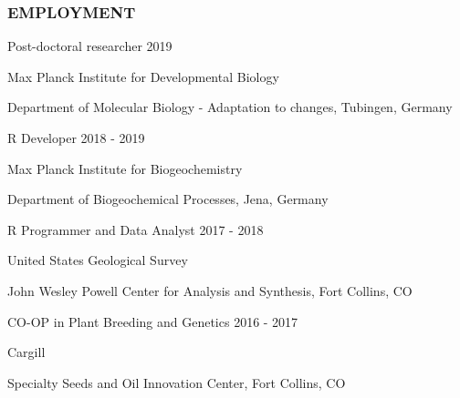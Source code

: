 \documentclass[12pt,english]{article}
\begin{document}

\subsubsection*{EMPLOYMENT}
\vspace{-0.5ex}\par

\hspace{1.0em} Post-doctoral researcher
\hfill
2019
\vspace{-0.5ex}\par
\hspace{2.0em} Max Planck Institute for Developmental Biology
\vspace{-0.5ex}\par
\hspace{2.0em} Department of Molecular Biology - Adaptation to changes, Tubingen, Germany
\hfill
\vspace{0.5em}\par

\hspace{1.0em} R Developer
\hfill
2018 - 2019
\vspace{-0.5ex}\par
\hspace{2.0em} Max Planck Institute for Biogeochemistry
\vspace{-0.5ex}\par
\hspace{2.0em} Department of Biogeochemical Processes, Jena, Germany
\hfill
\vspace{0.5em}\par

\hspace{1.0em} R Programmer and Data Analyst
\hfill
2017 - 2018
\vspace{-0.5ex}\par
\hspace{2.0em} United States Geological Survey
\vspace{-0.5ex}\par
\hspace{2.0em} John Wesley Powell Center for Analysis and Synthesis, Fort Collins, CO
\hfill
\vspace{0.5em}\par

\hspace{1.0em} CO-OP in Plant Breeding and Genetics
\hfill
2016 - 2017
\vspace{-0.5ex}\par
\hspace{2.0em} Cargill
\vspace{-0.5ex}\par
\hspace{2.0em} Specialty Seeds and Oil Innovation Center, Fort Collins, CO
\vspace{0.5em}\par
\end{document}
